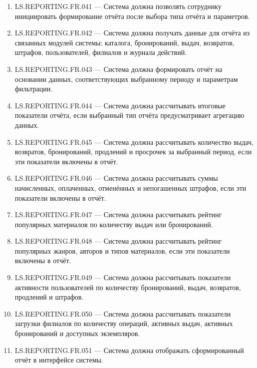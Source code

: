 \documentclass[12pt,a4paper]{article}
\begin{document}
\begin{enumerate}
		\item LS.REPORTING.FR.041 --- Система должна позволять сотруднику инициировать
		формирование отчёта после выбора типа отчёта и параметров.
		
		\item LS.REPORTING.FR.042 --- Система должна получать данные для отчёта из связанных
		модулей системы: каталога, бронирований, выдач, возвратов, штрафов, пользователей,
		филиалов и журнала действий.
		
		\item LS.REPORTING.FR.043 --- Система должна формировать отчёт на основании данных,
		соответствующих выбранному периоду и параметрам фильтрации.
		
		\item LS.REPORTING.FR.044 --- Система должна рассчитывать итоговые показатели
		отчёта, если выбранный тип отчёта предусматривает агрегацию данных.
		
		\item LS.REPORTING.FR.045 --- Система должна рассчитывать количество выдач,
		возвратов, бронирований, продлений и просрочек за выбранный период, если эти
		показатели включены в отчёт.
		
		\item LS.REPORTING.FR.046 --- Система должна рассчитывать суммы начисленных,
		оплаченных, отменённых и непогашенных штрафов, если эти показатели включены
		в отчёт.
		
		\item LS.REPORTING.FR.047 --- Система должна рассчитывать рейтинг популярных
		материалов по количеству выдач или бронирований.
		
		\item LS.REPORTING.FR.048 --- Система должна рассчитывать рейтинг популярных
		жанров, авторов и типов материалов, если эти показатели включены в отчёт.
		
		\item LS.REPORTING.FR.049 --- Система должна рассчитывать показатели активности
		пользователей по количеству бронирований, выдач, возвратов, продлений и штрафов.
		
		\item LS.REPORTING.FR.050 --- Система должна рассчитывать показатели загрузки
		филиалов по количеству операций, активных выдач, активных бронирований и
		доступных экземпляров.
		
		\item LS.REPORTING.FR.051 --- Система должна отображать сформированный отчёт
		в интерфейсе системы.
		

\end{enumerate}
\end{document}
